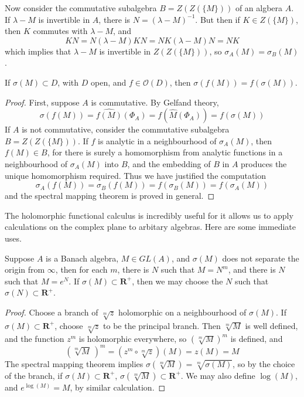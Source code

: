 Now consider the commutative subalgebra $B = Z(Z(\{ M \}))$ of an algbera $A$. If $\lambda - M$ is invertible in $A$, there is $N = (\lambda - M)^{-1}$. But then if $K \in Z(\{ M \})$, then $K$ commutes with $\lambda - M$, and
%
\[ KN = N(\lambda - M) K N = NK (\lambda - M) N = NK \]
%
which implies that $\lambda - M$ is invertible in $Z(Z(\{M\}))$, so $\sigma_A(M) = \sigma_B(M)$.

\begin{theorem}
    If $\sigma(M) \subset D$, with $D$ open, and $f \in \mathcal{O}(D)$, then $\sigma(f(M)) = f(\sigma(M))$.
\end{theorem}
\begin{proof}
    First, suppose $A$ is commutative. By Gelfand theory,
    \[ \sigma(f(M)) = \widehat{f(M)}(\Phi_A) = f(\widehat{M}(\Phi_A)) = f(\sigma(M)) \]
    If $A$ is not commutative, consider the commutative subalgebra $B = Z(Z(\{M\}))$. If $f$ is analytic in a neighbourhood of $\sigma_A(M)$, then $f(M) \in B$, for there is surely a homomorphism from analytic functions in a neighbourhood of $\sigma_A(M)$ into $B$, and the embedding of $B$ in $A$ produces the unique homomorphism required. Thus we have justified the computation
    \[ \sigma_A(f(M)) = \sigma_B(f(M)) = f(\sigma_B(M)) = f(\sigma_A(M)) \]
    and the spectral mapping theorem is proved in general.
\end{proof}

The holomorphic functional calculus is incredibly useful for it allows us to apply calculations on the complex plane to arbitary algebras. Here are some immediate uses.

\begin{theorem}
    Suppose $A$ is a Banach algebra, $M \in GL(A)$, and $\sigma(M)$ does not separate the origin from $\infty$, then for each $m$, there is $N$ such that $M = N^m$, and there is $N$ such that $M = e^N$. If $\sigma(M) \subset \mathbf{R}^+$, then we may choose the $N$ such that $\sigma(N) \subset \mathbf{R}^+$.
\end{theorem}
\begin{proof}
    Choose a branch of $\sqrt[m]{z}$ holomorphic on a neighbourhood of $\sigma(M)$. If $\sigma(M) \subset \mathbf{R}^+$, choose $\sqrt[m]{z}$ to be the principal branch. Then $\sqrt[m]{M}$ is well defined, and the function $z^m$ is holomorphic everywhere, so $(\sqrt[m]{M})^m$ is defined, and
    \[ \left( {\sqrt[m]{M}}\ \right)^m = (z^m \circ \sqrt[m]{z})(M) = z(M) = M \]
    The spectral mapping theorem implies $\sigma(\sqrt[m]{M}) = \sqrt[m]{\sigma(M)}$, so by the choice of the branch, if $\sigma(M) \subset \mathbf{R}^+$, $\sigma(\sqrt[m]{M}) \subset \mathbf{R}^+$. We may also define $\log(M)$, and $e^{\log(M)} = M$, by similar calculation.
\end{proof}


